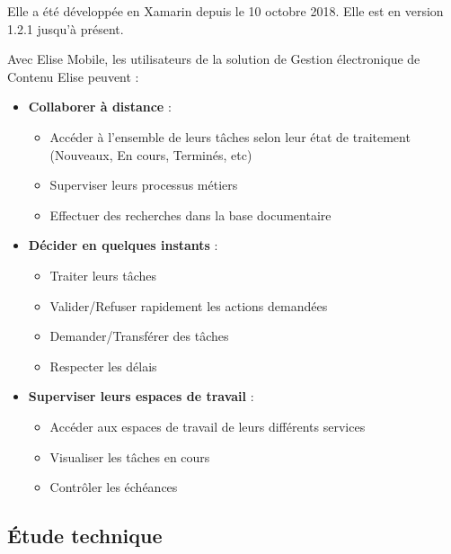 Elle a été développée en Xamarin depuis le 10 octobre 2018. Elle est en version 1.2.1 jusqu'à présent.

Avec Elise Mobile, les utilisateurs de la solution de Gestion électronique de Contenu Elise peuvent :

\begin{itemize}

\item \textbf{Collaborer à distance} : 
  \begin{itemize}
  \item Accéder à l'ensemble de leurs tâches selon leur état de traitement (Nouveaux, En cours, Terminés, etc)
  \item Superviser leurs processus métiers
  \item Effectuer des recherches dans la base documentaire
  \end{itemize}
\item \textbf{Décider en quelques instants} :
  \begin{itemize}
  \item Traiter leurs tâches
  \item Valider/Refuser rapidement les actions demandées
  \item Demander/Transférer des tâches
  \item Respecter les délais
  \end{itemize}
\item \textbf{Superviser leurs espaces de travail} :
  \begin{itemize}
    \item Accéder aux espaces de travail de leurs différents services
    \item Visualiser les tâches en cours
    \item Contrôler les échéances
  \end{itemize}
\end{itemize}

\subsection{Étude technique}
